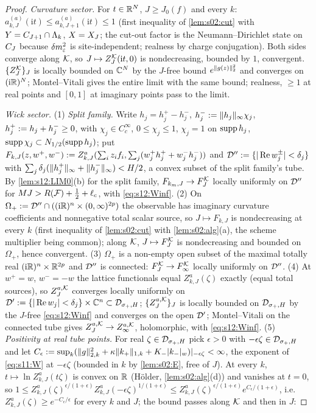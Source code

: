 \begin{proof}
\emph{Curvature sector.} For $t\in\mathbb R^N$, $J\ge J_0(f)$ and every $k$: $a^{(a)}_{k,J}(\mathrm it)\le a^{(a)}_{k,J+1}(\mathrm it)\le1$ (first inequality of \cref{lem:s02:cut} with $Y=C_{J+1}\cap\Lambda_k$, $X=X_J$; the cut-out factor is the Neumann--Dirichlet state on $C_J$ because $\delta m^2_{\varepsilon}$ is site-independent; realness by charge conjugation). Both sides converge along $\mathcal K$, so $J\mapsto Z^{\mathcal K}_J(\mathrm it,0)$ is nondecreasing, bounded by $1$, convergent. $\{Z^{\mathcal K}_J\}_J$ is locally bounded on $\mathbb C^N$ by the $J$-free bound $e^{\lVert g(z)\rVert_2^2}$ and converges on $(\mathrm i\mathbb R)^N$; Montel--Vitali gives the entire limit with the same bound; realness, $\ge1$ at real points and $[0,1]$ at imaginary points pass to the limit.

\emph{Wick sector.} (1) \emph{Split family.} Write $h_j=h_j^+-h_j^-$, $h_j^-:=\lVert h_j\rVert_\infty\chi_j$, $h^+_j:= h_j+h^-_j\ge0$, with $\chi_j\in C^\infty_c$, $0\le\chi_j\le1$, $\chi_j=1$ on $\operatorname{supp} h_j$, $\operatorname{supp}\chi_j\subset N_{1/2}(\operatorname{supp} h_j)$; put $F_{k,J}(z,w^+,w^-):= Z^a_{k,J}(\sum_iz_if_i,\sum_j(w^+_jh^+_j+w^-_jh^-_j))$ and $\mathcal D'':=\{|\operatorname{Re} w^\pm_j|<\delta_j\}$ with $\sum_j\delta_j(\lVert h^+_j\rVert_\infty+\lVert h^-_j\rVert_\infty)<H/2$, a convex subset of the split family's tube. By \cref{lem:s12:LIM0}(b) for the split family, $F_{k_m,J}\to F^{\mathcal K}_J$ locally uniformly on $\mathcal D''$ for $MJ>R(\mathcal F)+\frac12+\ell_c$, with \eqref{eq:s12:Winf}. (2) On $\Omega_+:=\mathcal D''\cap((\mathrm i\mathbb R)^n\times(0,\infty)^{2p})$ the observable has imaginary curvature coefficients and nonnegative total scalar source, so $J\mapsto F_{k,J}$ is nondecreasing at every $k$ (first inequality of \cref{lem:s02:cut} with \cref{lem:s02:alg}(a), the scheme multiplier being common); along $\mathcal K$, $J\mapsto F^{\mathcal K}_J$ is nondecreasing and bounded on $\Omega_+$, hence convergent. (3) $\Omega_+$ is a non-empty open subset of the maximal totally real $(\mathrm i\mathbb R)^n\times\mathbb R^{2p}$ and $\mathcal D''$ is connected: $F^{\mathcal K}_J\to F^{\mathcal K}_\infty$ locally uniformly on $\mathcal D''$. (4) At $w^+=w$, $w^-=-w$ the lattice functionals equal $Z^a_{k,J}(\zeta)$ exactly (equal total sources), so $Z^{a,\mathcal K}_J$ converges locally uniformly on $\mathcal D':=\{|\operatorname{Re} w_j|<\delta_j\}\times\mathbb C^n\subset\mathcal D_{\sigma_+,H}$; $\{Z^{a,\mathcal K}_J\}_J$ is locally bounded on $\mathcal D_{\sigma_+,H}$ by the $J$-free \eqref{eq:s12:Winf} and converges on the open $\mathcal D'$; Montel--Vitali on the connected tube gives $Z^{a,\mathcal K}_J\to Z^{a,\mathcal K}_\infty$, holomorphic, with \eqref{eq:s12:Winf}. (5) \emph{Positivity at real tube points.} For real $\zeta\in\mathcal D_{\sigma_+,H}$ pick $\epsilon>0$ with $-\epsilon\zeta\in\mathcal D_{\sigma_+,H}$ and let $C_\epsilon:=\sup_k(\lVert g\rVert^2_{2,k}+\kappa\lVert k_+\rVert_{1,k}+K_-\lvert k_-\rvert_{w})|_{-\epsilon\zeta}<\infty$, the exponent of \eqref{eq:s11:W} at $-\epsilon\zeta$ (bounded in $k$ by \cref{lem:s02:E}, free of $J$). At every $k$, $t\mapsto\ln Z^a_{k,J}(t\zeta)$ is convex on $\mathbb R$ (H\"older, \cref{lem:s02:alg}(d)) and vanishes at $t=0$, so $1\le Z^a_{k,J}(\zeta)^{\epsilon/(1+\epsilon)}Z^a_{k,J}(-\epsilon\zeta)^{1/(1+\epsilon)}\le Z^a_{k,J}(\zeta)^{\epsilon/(1+\epsilon)}e^{C_\epsilon/(1+\epsilon)}$, i.e.\ $Z^a_{k,J}(\zeta)\ge e^{-C_\epsilon/\epsilon}$ for every $k$ and $J$; the bound passes along $\mathcal K$ and then in $J$: 
\end{proof}
